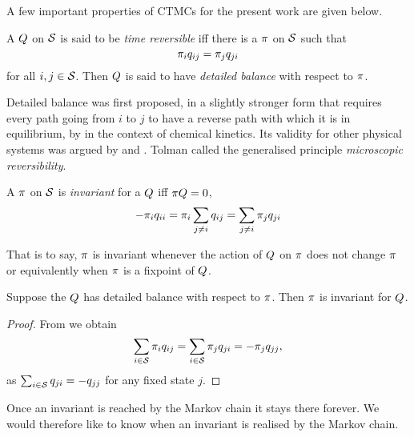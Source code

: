 A few important properties of CTMCs
for the present work are given below.

\begin{definition}
  \label{def:detailed-balance}
  A \qmatrix $Q$ on $\mathcal{S}$
  is said to be \emph{time reversible} iff
  there is a \pmf $\pi$ on $\mathcal{S}$ such that
  \begin{equation}
    \label{eq:detailed-balance}
    \pi_i q_{ij} = \pi_j q_{ji}
  \end{equation}
  for all $i,j \in \mathcal{S}$.
  Then $Q$ is said to have \emph{detailed balance}
  with respect to $\pi$.
\end{definition}

Detailed balance was first proposed,
in a slightly stronger form
that requires every path going from $i$ to $j$
to have a reverse path with which it is in equilibrium,
by \citet{wegscheider} in the context of chemical kinetics.
Its validity for other physical systems was argued by
\citet{lewis} and \citet{tolman}.
Tolman called the generalised principle
\emph{microscopic reversibility}.

\begin{definition}
  A \pmf $\pi$ on $\mathcal{S}$ is
  \emph{invariant} for a \qmatrix $Q$
  iff $\pi Q = 0$, \ie
  \[ -\pi_i q_{ii} = \pi_i \sum_{j \neq i} q_{ij}
                  = \sum_{j \neq i} \pi_j q_{ji} \]
\end{definition}

That is to say, $\pi$ is invariant
whenever the action of $Q$ on $\pi$ does not change $\pi$
or equivalently when $\pi$ is a fixpoint of $Q$.

\begin{lemma}
  Suppose the \qmatrix $Q$
  has detailed balance with respect to $\pi$.
  Then $\pi$ is invariant for $Q$.
\end{lemma}
\begin{proof}
  From  we obtain
  \[ \sum_{i \in \mathcal{S}} \pi_i q_{ij} =
     \sum_{i \in \mathcal{S}} \pi_j q_{ji} = -\pi_j q_{jj}, \]
  as $\sum_{i \in \mathcal{S}} q_{ji} = -q_{jj}$ for any fixed state $j$.
\end{proof}

Once an invariant \pmf is reached by the Markov chain
it stays there forever.
We would therefore like to know when an invariant
\pmf is realised by the Markov chain.

